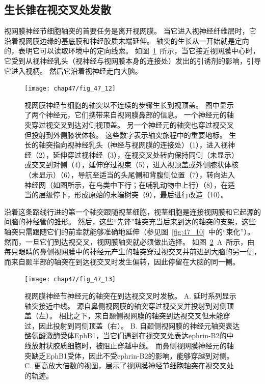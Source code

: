 \subsection{生长锥在视交叉处发散}

视网膜神经节细胞轴突的首要任务是离开视网膜。
当它进入视神经纤维层时，它沿着视网膜边缘的基底膜和神经胶质末端延伸。
轴突的生长从一开始就是定向的，表明它可以读取环境中的定向线索。
如图~\ref{fig:47_12}~所示，当它接近视网膜中心时，它受到从视神经乳头（视神经与视网膜本身的连接处）发出的引诱剂的影响，引导它进入视柄。
然后它沿着视神经走向大脑。


\begin{figure}[htbp]
	\centering
	\texttt{[image: chap47/fig\_47\_12]}
	\caption{视网膜神经节细胞的轴突以不连续的步骤生长到视顶盖。
		图中显示了两个神经元，它们携带来自视网膜鼻部的信息。
		一个神经元的轴突穿过视交叉到达对侧视顶盖。
		另一个神经元的轴突也穿过视交叉但投射到外侧膝状体核。
		这些数字表示轴突旅程中的重要地标。
		生长的轴突指向视神经乳头（神经与视网膜的连接处）（1），进入视神经（2），延伸穿过视神经（3），在视交叉处转向保持同侧（未显示）或交叉到对侧（4），延伸穿过视束（5），进入视顶盖或外侧膝状体核（未显示）（6），导航至适当的头尾侧和背腹侧位置（7），转向进入神经网（如图所示，在鸟类中下行；在哺乳动物中上行）（8），在适当的层级停下，形成原始的末端树突（9），最后进行改造（10）。}
	\label{fig:47_12}
\end{figure}


沿着这条路线行进的第一个轴突跟随视茎细胞，视茎细胞是连接视网膜和它起源的间脑的神经管的雏形。
然后，这些“先锋”轴突充当后来到达的轴突的支架，这些轴突只需跟随它们的前辈就能够准确地延伸（参见图~\ref{fig:47_10}~中的“束化”）。
然而，一旦它们到达视交叉，视网膜轴突就必须做出选择。
如图~\ref{fig:47_13}~A~所示，由每只眼睛的鼻侧视网膜中的神经元产生的轴突穿过视交叉并前进到大脑的另一侧，而来自颞半部的轴突在到达视交叉时发生偏转，因此停留在大脑的同一侧。


\begin{figure}[htbp]
	\centering
	\texttt{[image: chap47/fig\_47\_13]}
	\caption{视网膜神经节神经元的轴突在到达视交叉时发散。
		A. 延时系列显示轴突接近中线。
		源自鼻侧视网膜的轴突穿过视交叉并投射到对侧顶盖（左）。
		相比之下，来自颞侧视网膜的轴突到达视交叉但未能穿过，因此投射到同侧顶盖（右）。
		B. 自颞侧视网膜的神经元轴突表达酪氨酸激酶受体EphB1，当它们遇到在视交叉处表达ephrin-B2的中线放射状胶质细胞时，被阻止穿越中线。
		而鼻侧视网膜神经元的轴突缺乏EphB1受体，因此不受ephrin-B2的影响，能够穿越到对侧。
		C. 更高放大倍数的视图，展示了视网膜神经节细胞轴突在视交叉处的轨迹。}
	\label{fig:47_13}
\end{figure}


